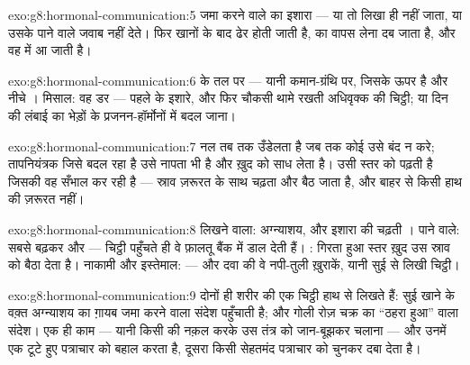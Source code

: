 \begin{solution}{exo:g8:hormonal-communication:5}
जमा करने वाले  का इशारा --- या तो लिखा ही नहीं जाता, या उसके पाने
वाले जवाब नहीं देते। फिर खानों के बाद  ढेर होती जाती है, 
का वापस लेना दब जाता है, और वह  में आ जाती है।
\end{solution}

\begin{solution}{exo:g8:hormonal-communication:6}
 के तल पर --- यानी कमान-ग्रंथि पर, जिसके ऊपर  है
और नीचे । मिसाल: वह डर --- पहले  के इशारे, और फिर चौकसी
थामे रखती अधिवृक्क की चिट्ठी; या दिन की लंबाई का भेड़ों के प्रजनन-हॉर्मोनों
में बदल जाना।
\end{solution}

\begin{solution}{exo:g8:hormonal-communication:7}
नल तब तक उँडेलता है जब तक कोई उसे बंद न करे; तापनियंत्रक जिसे बदल रहा है
उसे नापता भी है और ख़ुद को साध लेता है।  उसी स्तर को पढ़ती है
जिसकी वह सँभाल कर रही है --- स्राव ज़रूरत के साथ चढ़ता और बैठ जाता है,
और बाहर से किसी हाथ की ज़रूरत नहीं।
\end{solution}

\begin{solution}{exo:g8:hormonal-communication:8}
लिखने वाला: अग्न्याशय, और इशारा  की चढ़ती । पाने वाले: सबसे
बढ़कर  और  --- चिट्ठी पहुँचते ही वे फ़ालतू बैंक में डाल देती
हैं। : गिरता हुआ स्तर ख़ुद उस स्राव को बैठा देता है। नाकामी
और इस्तेमाल:  --- और दवा की वे नपी-तुली ख़ुराकें, यानी सुई से लिखी
चिट्ठी।
\end{solution}

\begin{solution}{exo:g8:hormonal-communication:9}
दोनों ही शरीर की एक चिट्ठी हाथ से लिखते हैं: सुई खाने के वक़्त
अग्न्याशय का ग़ायब जमा करने वाला संदेश पहुँचाती है; और गोली रोज़ चक्र का
``ठहरा हुआ'' वाला संदेश। एक ही काम --- यानी किसी  की नक़ल करके उस
तंत्र को जान-बूझकर चलाना --- और उनमें एक टूटे हुए पत्राचार को बहाल करता
है, दूसरा किसी सेहतमंद पत्राचार को चुनकर दबा देता है।
\end{solution}


